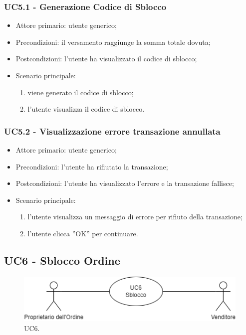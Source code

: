 \subsubsection{UC5.1 - Generazione Codice di Sblocco}

\begin{itemize}
    \item Attore primario: utente generico;
    \item Precondizioni: il versamento raggiunge la somma totale dovuta;
    \item Postcondizioni: l'utente ha visualizzato il codice di sblocco;
    \item Scenario principale:
    \begin{enumerate}
        \item viene generato il codice di sblocco;
        \item l'utente visualizza il codice di sblocco.
    \end{enumerate}
\end{itemize}

\subsubsection{UC5.2 - Visualizzazione errore transazione annullata}

\begin{itemize}
    \item Attore primario: utente generico;
    \item Precondizioni: l'utente ha rifiutato la transazione;
    \item Postcondizioni: l'utente ha visualizzato l'errore e la transazione fallisce;
    \item Scenario principale:
    \begin{enumerate}
        \item l'utente visualizza un messaggio di errore per rifiuto della transazione;
        \item l'utente clicca ”OK” per continuare.
    \end{enumerate}
\end{itemize}

\subsection{UC6 - Sblocco Ordine}

\begin{figure}[H]
    \centering
    \includegraphics[scale=0.7]{immagini/UseCases-UC6.png}
    \caption{UC6.}
  \end{figure}

